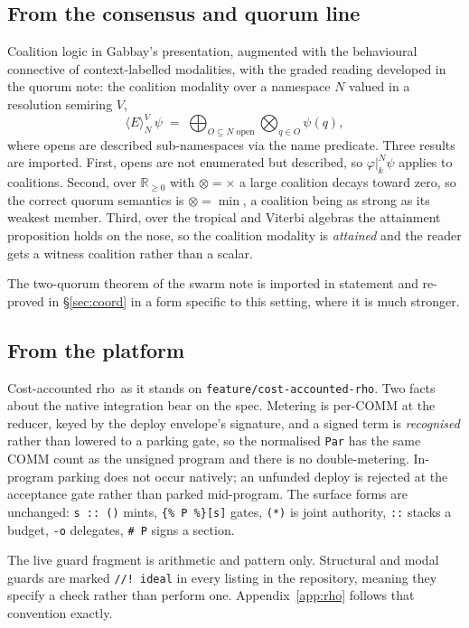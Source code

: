 \documentclass[11pt,a4paper]{article}
\theoremstyle{plain}
\theoremstyle{definition}
\theoremstyle{remark}
\newcommand{\rhoc}{\textsf{rho}}
\newcommand{\Rnn}{\mathbb{R}_{\geq 0}}
\newcommand{\Emod}[2]{\langle E\rangle^{#2}_{#1}}
\newcommand{\gsep}[2]{\mathbin{|_{#1}^{#2}}}
\begin{document}
\subsection{From the consensus and quorum line}

Coalition logic in Gabbay's presentation, augmented with the behavioural
connective of context-labelled modalities, with the graded reading developed in
the quorum note: the coalition modality over a namespace $N$ valued in a
resolution semiring $V$,
\[
  \Emod{N}{V}\,\psi \;=\; \bigoplus_{O \subseteq N \text{ open}}
                          \bigotimes_{q \in O} \psi(q),
\]
where opens are described sub-namespaces via the name predicate. Three results
are imported. First, opens are not enumerated but described, so
$\varphi \gsep{k}{N} \psi$ applies to coalitions. Second, over $\Rnn$ with
$\otimes = \times$ a large coalition decays toward zero, so the correct quorum
semantics is $\otimes = \min$, a coalition being as strong as its weakest
member. Third, over the tropical and Viterbi algebras the attainment proposition
holds on the nose, so the coalition modality is \emph{attained} and the reader
gets a witness coalition rather than a scalar.

The two-quorum theorem of the swarm note is imported in statement and
re-proved in \S\ref{sec:coord} in a form specific to this setting, where it is
much stronger.

\subsection{From the platform}

Cost-accounted \rhoc\ as it stands on \texttt{feature/cost-accounted-rho}. Two
facts about the native integration bear on the spec. Metering is per-COMM at the
reducer, keyed by the deploy envelope's signature, and a signed term is
\emph{recognised} rather than lowered to a parking gate, so the normalised
\texttt{Par} has the same COMM count as the unsigned program and there is no
double-metering. In-program parking does not occur natively; an unfunded deploy
is rejected at the acceptance gate rather than parked mid-program. The surface
forms are unchanged: \texttt{s :: ()} mints, \texttt{\{\% P \%\}[s]} gates,
\texttt{(*)} is joint authority, \texttt{::} stacks a budget, \texttt{-o}
delegates, \texttt{\# P} signs a section.

The live guard fragment is arithmetic and pattern only. Structural and modal
guards are marked \texttt{//! ideal} in every listing in the repository, meaning
they specify a check rather than perform one. Appendix~\ref{app:rho} follows
that convention exactly.
\end{document}
